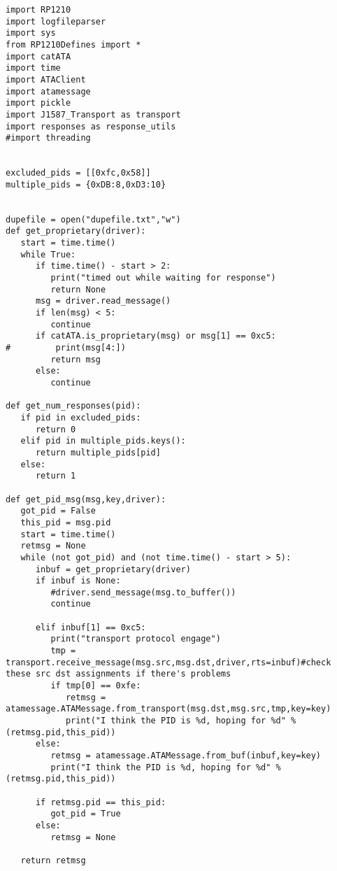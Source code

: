 

\label{app:extraction}
%
\begin{verbatim}
import RP1210
import logfileparser
import sys
from RP1210Defines import *
import catATA
import time
import ATAClient
import atamessage
import pickle
import J1587_Transport as transport
import responses as response_utils
#import threading


excluded_pids = [[0xfc,0x58]]
multiple_pids = {0xDB:8,0xD3:10}


dupefile = open("dupefile.txt","w")
def get_proprietary(driver):
   start = time.time()
   while True:
      if time.time() - start > 2:
         print("timed out while waiting for response")
         return None
      msg = driver.read_message()
      if len(msg) < 5:
         continue
      if catATA.is_proprietary(msg) or msg[1] == 0xc5:
#         print(msg[4:])
         return msg
      else:
         continue

def get_num_responses(pid):
   if pid in excluded_pids:
      return 0
   elif pid in multiple_pids.keys():
      return multiple_pids[pid]
   else:
      return 1

def get_pid_msg(msg,key,driver):
   got_pid = False
   this_pid = msg.pid
   start = time.time()
   retmsg = None
   while (not got_pid) and (not time.time() - start > 5):
      inbuf = get_proprietary(driver)
      if inbuf is None:
         #driver.send_message(msg.to_buffer())
         continue

      elif inbuf[1] == 0xc5:
         print("transport protocol engage")
         tmp = transport.receive_message(msg.src,msg.dst,driver,rts=inbuf)#check these src dst assignments if there's problems
         if tmp[0] == 0xfe:
            retmsg = atamessage.ATAMessage.from_transport(msg.dst,msg.src,tmp,key=key)
            print("I think the PID is %d, hoping for %d" % (retmsg.pid,this_pid))
      else:
         retmsg = atamessage.ATAMessage.from_buf(inbuf,key=key)
         print("I think the PID is %d, hoping for %d" % (retmsg.pid,this_pid))

      if retmsg.pid == this_pid:
         got_pid = True
      else:
         retmsg = None

   return retmsg




\end{verbatim}
